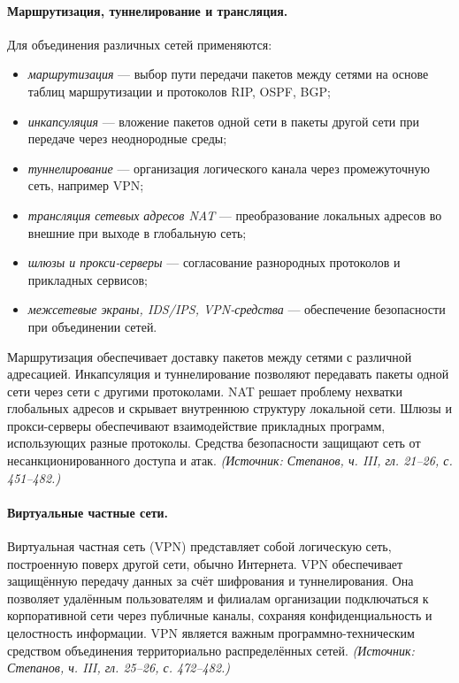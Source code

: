 \documentclass[a4paper,12pt]{article}
\begin{document}
\paragraph{Маршрутизация, туннелирование и трансляция.}
Для объединения различных сетей применяются:
\begin{itemize}
\item \emph{маршрутизация} — выбор пути передачи пакетов между сетями на основе таблиц маршрутизации и протоколов RIP, OSPF, BGP;
\item \emph{инкапсуляция} — вложение пакетов одной сети в пакеты другой сети при передаче через неоднородные среды;
\item \emph{туннелирование} — организация логического канала через промежуточную сеть, например VPN;
\item \emph{трансляция сетевых адресов NAT} — преобразование локальных адресов во внешние при выходе в глобальную сеть;
\item \emph{шлюзы и прокси-серверы} — согласование разнородных протоколов и прикладных сервисов;
\item \emph{межсетевые экраны, IDS/IPS, VPN-средства} — обеспечение безопасности при объединении сетей.
\end{itemize}
Маршрутизация обеспечивает доставку пакетов между сетями с различной адресацией. Инкапсуляция и туннелирование позволяют передавать пакеты одной сети через сети с другими протоколами. NAT решает проблему нехватки глобальных адресов и скрывает внутреннюю структуру локальной сети. Шлюзы и прокси-серверы обеспечивают взаимодействие прикладных программ, использующих разные протоколы. Средства безопасности защищают сеть от несанкционированного доступа и атак.
\textit{(Источник: Степанов, ч. III, гл. 21–26, с. 451–482.)}

\paragraph{Виртуальные частные сети.}
Виртуальная частная сеть (VPN) представляет собой логическую сеть, построенную поверх другой сети, обычно Интернета. VPN обеспечивает защищённую передачу данных за счёт шифрования и туннелирования. Она позволяет удалённым пользователям и филиалам организации подключаться к корпоративной сети через публичные каналы, сохраняя конфиденциальность и целостность информации. VPN является важным программно-техническим средством объединения территориально распределённых сетей.
\textit{(Источник: Степанов, ч. III, гл. 25–26, с. 472–482.)}
\end{document}

